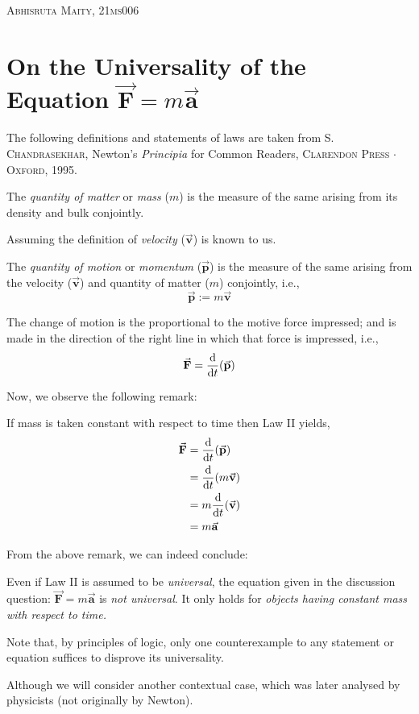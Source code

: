 \documentclass[11pt]{scrartcl}
\newcommand{\ve}[1]{\vec{\mathbf{#1}}}
\begin{document}
{\large \textsc{Abhisruta Maity, 21ms006}}

\section{On the Universality of the Equation \(\ve{F} = m\ve{a}\)}
The following definitions and statements of laws are taken from \textsc{S. Chandrasekhar,} Newton's \emph{Principia} for Common Readers, \textsc{Clarendon Press \(\cdot\) Oxford}, 1995.
    \begin{definition}
        The \emph{quantity of matter} or \emph{mass} (\(m\)) is the measure of the same arising from its density and bulk conjointly.
    \end{definition}
    Assuming the definition of \emph{velocity} (\(\ve{v}\)) is known to us.
    \begin{definition}[Quantity of Motion; Momentum \(\ve{p}\)]
        The \emph{quantity of motion} or \emph{momentum} (\(\ve{p}\)) is the measure of the same arising from the velocity (\(\ve{v}\)) and quantity of matter (\(m\)) conjointly, i.e., \[\ve{p} := m \ve{v}\]
    \end{definition}
    \begin{law}
        The change of motion is the proportional to the motive force impressed; and is made in the direction of the right line in which that force is impressed, i.e., \[\ve{F} = \dt{\ve{p}}\]
    \end{law}
    Now, we observe the following remark:
    \begin{remark}
        If mass is taken constant with respect to time then Law II yields,
        \begin{align*}
            \ve{F} &= \dt{\ve{p}} \\
            &= \dt{m\ve{v}} \\
            &= m \dt{\ve{v}} \\
            &= m\ve{a}
        \end{align*}
    \end{remark}
    From the above remark, we can indeed conclude: 
    \begin{conclusion}
        Even if Law II is assumed to be \emph{universal}, the equation given in the discussion question: \(\ve{F} = m\ve{a}\) is \emph{not universal}. It only holds for \emph{objects having constant mass with respect to time.}

        Note that, by principles of logic, only one counterexample to any statement or equation suffices to disprove its universality.
    \end{conclusion}
    Although we will consider another contextual case, which was later analysed by physicists (not originally by Newton).
\end{document}
